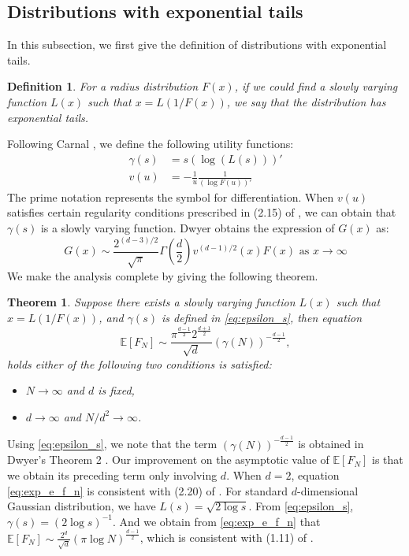 \documentclass[conference,a4paper]{IEEEtran}
\def\E{\mathbb{E}}
\newtheorem{theorem}{Theorem}
\newtheorem{definition}{Definition}
\begin{document}
\subsection{Distributions with exponential tails}
In this subsection, we first give the definition of distributions with exponential tails.
\begin{definition}
  For a radius distribution $F(x)$, if we could find
  a slowly varying function $L(x)$ such that
  $x = L(1/F(x))$, we say that the distribution has exponential tails.
\end{definition}
Following Carnal \cite{carnal1970konvexe},
we define the following utility functions:
\begin{align}
     \gamma(s) & = s (\log (L(s)))' \label{eq:epsilon_s}\\
     v(u) &= -\frac{1}{u} \frac{1}{(\log F(u))'}    
\end{align}
The prime notation represents the symbol for differentiation. When $v(u)$ satisfies
certain regularity conditions prescribed in (2.15) of \cite{carnal1970konvexe},
we can obtain that $\gamma(s)$ is a slowly varying function.
Dwyer \cite{dwyer1991convex} obtains the expression of $G(x)$ as:
\begin{equation}\label{eq:G_x_exp}
     G(x) \sim \frac{2^{(d-3)/2}}{\sqrt{\pi}}\Gamma\left(\frac{d}{2}\right)
     v^{(d-1)/2}(x) F(x)
      \textrm{ as } x\to \infty
\end{equation}
We make the analysis complete by giving the following theorem.
\begin{theorem}\label{thm:exponential_tails}
     Suppose there exists a slowly
     varying function $L(x)$ such that $x=L(1/F(x))$,
     and $\gamma(s)$ is defined in \eqref{eq:epsilon_s}, then
  equation
  \begin{equation}\label{eq:exp_e_f_n}
     \E[F_N]\sim \frac{\pi^{\frac{d-1}{2}} 2^{\frac{d+1}{2}}}{\sqrt{d}} (\gamma(N))^{-\frac{d-1}{2}},
 \end{equation}
 holds either of the following two conditions is satisfied:
  \begin{itemize}
     \item $N \to \infty$ and $d$ is fixed,     
     \item  $d\to\infty$ and $N/d^2\to \infty$.
  \end{itemize}
\end{theorem}
 Using \eqref{eq:epsilon_s}, we note that the term
 $(\gamma(N))^{-\frac{d-1}{2}}$
 is obtained in Dwyer's Theorem 2 \cite{dwyer1991convex}.
 Our improvement on the asymptotic value of $\E[F_N]$ is that we obtain its preceding term only involving $d$.
 When $d=2$, equation \eqref{eq:exp_e_f_n} is consistent with (2.20) of \cite{carnal1970konvexe}.
 For standard $d$-dimensional Gaussian distribution, we have $L(s)=\sqrt{2\log s}$.
 From \eqref{eq:epsilon_s}, $\gamma(s) = (2\log s)^{-1}$. And we obtain from \eqref{eq:exp_e_f_n}
 that $\E[F_N]\sim \frac{2^d}{\sqrt{d}}(\pi \log N)^{\frac{d-1}{2}}$,
 which is consistent with (1.11) of \cite{raynaud1970enveloppe}.
\end{document}
